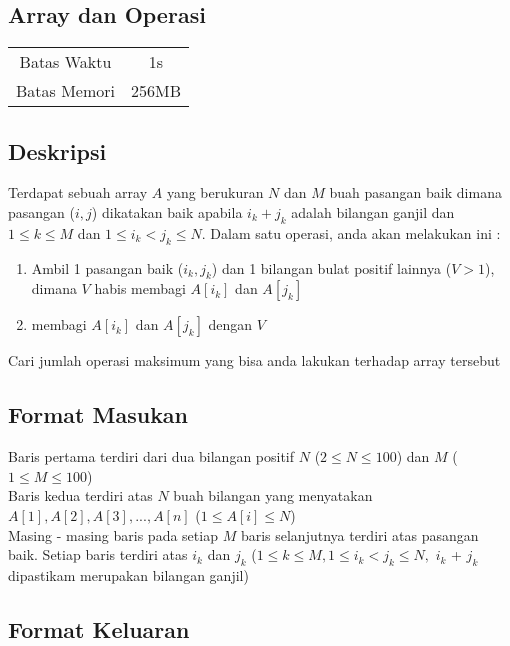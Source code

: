 \documentclass{article}
\begin{document}
\begin{center}

    
    \section*{Array dan Operasi} %

    \begin{tabular}{ | c c | }
        \hline
        Batas Waktu  & 1s \\    %
        Batas Memori & 256MB \\  %
        \hline
    \end{tabular}
\end{center}

\subsection*{Deskripsi}
Terdapat sebuah array $A$ yang berukuran $N$ dan $M$ buah pasangan baik dimana pasangan ($i,j$) dikatakan baik apabila $i_k + j_k$ adalah bilangan ganjil dan $1 \leq k \leq M$ dan $1 \leq i_k < j_k \leq N$. Dalam satu operasi, anda akan melakukan ini :
\begin{enumerate}
    \item Ambil 1 pasangan baik ($i_k, j_k$) dan 1 bilangan bulat positif lainnya ($V > 1$), dimana $V$ habis membagi $A[i_k]$ dan $A[j_k]$
    \item membagi $A[i_k]$ dan $A[j_k]$ dengan $V$
\end{enumerate}
Cari jumlah operasi maksimum yang bisa anda lakukan terhadap array tersebut
\subsection*{Format Masukan}

Baris pertama terdiri dari dua bilangan positif $N$ ($2 \leq N \leq 100$) dan $M$ ($1 \leq M \leq 100$)\\
Baris kedua terdiri atas $N$ buah bilangan yang menyatakan $A[1], A[2], A[3], ... ,A[n]$ ($1 \leq A[i] \leq N$)\\
Masing - masing baris pada setiap $M$ baris selanjutnya terdiri atas pasangan baik. Setiap baris terdiri atas $i_k$ dan $j_k$ ($1 \leq k \leq M,1 \leq i_k < j_k \leq N,$ $i_k$ + $j_k$ dipastikam  merupakan bilangan ganjil) 

\subsection*{Format Keluaran}
\end{document}

